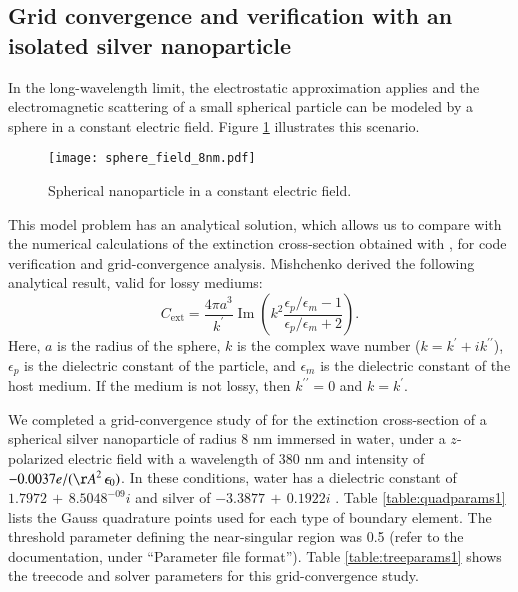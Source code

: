 
\subsection{Grid convergence and verification with an isolated silver nanoparticle} \label{sec:verification}

\noindent In the long-wavelength limit, the electrostatic approximation applies and
the electromagnetic scattering of a small spherical particle can be modeled
by a sphere in a constant electric field. 
Figure \ref{fig:np_elec_field} illustrates this scenario.

%
\begin{figure}[h] %
   \centering
   \texttt{[image: sphere\_field\_8nm.pdf]} 
   \caption{Spherical nanoparticle in a constant electric field.}
   \label{fig:np_elec_field}
\end{figure}
%

This model problem has an analytical solution, which allows us to compare with
the numerical calculations of the extinction cross-section obtained with \pygbe,
for code verification and grid-convergence analysis.
Mishchenko \cite{Mishchenko2007} derived the following analytical result, 
valid for lossy mediums:
%
\begin{equation} 
    C_\text{ext} = \frac{4\pi a^3}{k^\prime} \operatorname{Im}\left(k^2 
                    \frac{\epsilon_p/\epsilon_m -1}{\epsilon_p/\epsilon_m +2}\right).
    \label{eq:an_sol}
\end{equation}
%
Here, $a$ is the radius of the sphere, $k$ is the complex wave number ($k=k^\prime +i k^{\prime\prime}$), $\epsilon_p$ 
is the dielectric constant of the particle, and $\epsilon_m$ is the dielectric constant
of the host medium. If the medium is not lossy, then $k^{\prime\prime}=0$ and $k=k^\prime$.

We completed a grid-convergence study of \pygbe for the extinction
cross-section of a spherical silver nanoparticle of radius 8 nm immersed in water,
under a $z$-polarized electric field with a wavelength of 380 nm and intensity of 
$-0.0037 e/({\AA}^2 \, \epsilon_0)$. In these conditions, water has a dielectric
constant of $1.7972 \, + \, 8.5048^{-09}i$ \cite{JohnsonChristy1972} and silver of
$-3.3877 \, + \, 0.1922i$ \cite{HaleQuerry1972}. 
Table \ref{table:quadparams1} lists the Gauss quadrature points used for each type of boundary element. 
The threshold parameter defining the near-singular region was 0.5 
(refer to the \pygbe documentation, under ``Parameter file format'').
Table \ref{table:treeparams1} shows the treecode and solver parameters for this grid-convergence study.

